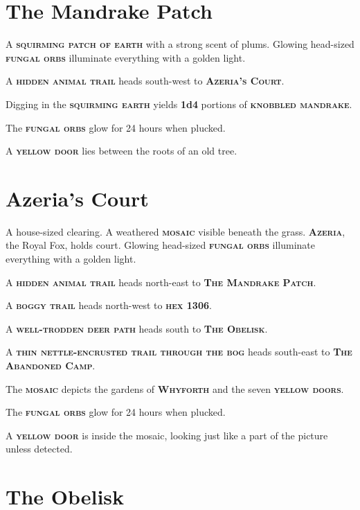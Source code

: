 \documentclass[10pt]{article}
\newcommand\locationcolour{Mahogany}
\newcommand\npccolour{CornflowerBlue}
\newcommand{\keyword}[1]{\textsc{\textbf{#1}}}
\newcommand{\location}[1]{\keyword{\color{\locationcolour}#1}}
\newcommand{\npc}[1]{\keyword{\color{\npccolour}#1}}
\begin{document}
\begin{multicols*}{2}
\section{The Mandrake Patch}


A \keyword{squirming patch of earth} with a strong scent of plums.
Glowing head-sized \keyword{fungal orbs} illuminate everything with a
golden light.

A \keyword{hidden animal trail} heads south-west to \location{Azeria's
  Court}.

Digging in the \keyword{squirming earth} yields \textbf{1d4} portions
of \keyword{knobbled mandrake}.

The \keyword{fungal orbs} glow for 24 hours when plucked.

A \keyword{yellow door} lies between the roots of an old tree.

\section{Azeria's Court}


A house-sized clearing.  A weathered \keyword{mosaic} visible beneath
the grass.  \npc{Azeria}, the Royal Fox, holds court.  Glowing
head-sized \keyword{fungal orbs} illuminate everything with a golden
light.

A \keyword{hidden animal trail} heads north-east to \location{The
  Mandrake Patch}.

A \keyword{boggy trail} heads north-west to \location{hex 1306}.

A \keyword{well-trodden deer path} heads south to \location{The
  Obelisk}.

A \keyword{thin nettle-encrusted trail through the bog} heads
south-east to \location{The Abandoned Camp}.

The \keyword{mosaic} depicts the gardens of \location{Whyforth} and
the seven \keyword{yellow doors}.

The \keyword{fungal orbs} glow for 24 hours when plucked.

A \keyword{yellow door} is inside the mosaic, looking just like a part
of the picture unless detected.

\section{The Obelisk}


\end{multicols*}
\end{document}
